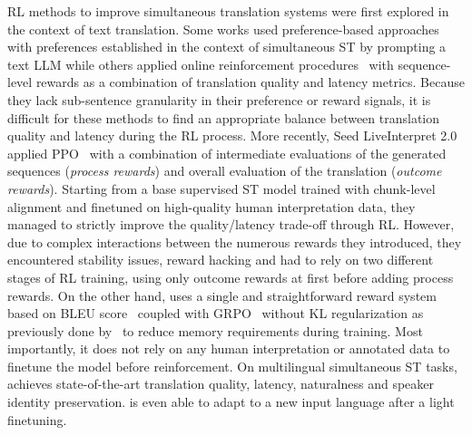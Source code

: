 RL methods to improve simultaneous translation systems were first explored in the context of text translation. Some works used preference-based approaches~\cite{simulpl} with preferences established in the context of simultaneous ST by prompting a text LLM while others applied online reinforcement procedures~\cite{simulpl, seqpo_simt} with sequence-level rewards as a combination of translation quality and latency metrics. Because they lack sub-sentence granularity in their preference or reward signals, it is difficult for these methods to find an appropriate balance between translation quality and latency during the RL process. More recently, Seed LiveInterpret 2.0~\cite{seed_liveinterpret_2} applied PPO~\cite{ppo} with a combination of intermediate evaluations of the generated sequences (\textit{process rewards}) and overall evaluation of the translation (\textit{outcome rewards}). Starting from a base supervised ST model trained with chunk-level alignment and finetuned on high-quality human interpretation data, they managed to strictly improve the quality/latency trade-off through RL. However, due to complex interactions between the numerous rewards they introduced, they encountered stability issues, reward hacking and had to rely on two different stages of RL training, using only outcome rewards at first before adding process rewards. On the other hand, \ours{} uses a single and straightforward reward system based on BLEU score~\cite{bleu} coupled with GRPO~\cite{grpo} without KL regularization as previously done by~\citet{magistral} to reduce memory requirements during training. Most importantly, it does not rely on any human interpretation or annotated data to finetune the model before reinforcement. On multilingual simultaneous ST tasks, \ours{} achieves state-of-the-art translation quality, latency, naturalness and speaker identity preservation. \ours{} is even able to adapt to a new input language after a light finetuning.